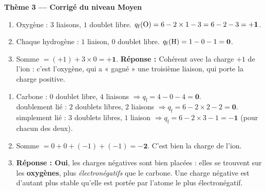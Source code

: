 \documentclass[11pt,a4paper]{article}
\newcommand{\rep}{\textbf{\textcolor{corcol}{Réponse : }}}
\begin{document}
\begin{center}
{\Large\bfseries\color{primarydark}Thème 3 — Corrigé du niveau Moyen}
\end{center}
\medskip

\begin{cor}
\begin{enumerate}[label=\alph*),leftmargin=2em,itemsep=2pt]
  \item Oxygène : $3$ liaisons, $1$ doublet libre.\;
        $q_{\mathrm{f}}(\ce{O}) = 6 - 2\times 1 - 3 = 6 - 2 - 3 = \mathbf{+1}$.
  \item Chaque hydrogène : $1$ liaison, $0$ doublet libre.\;
        $q_{\mathrm{f}}(\ce{H}) = 1 - 0 - 1 = \mathbf{0}$.
  \item Somme $= (+1) + 3\times 0 = \mathbf{+1}$. \checkmark\;
        \rep Cohérent avec la charge $+1$ de l'ion  : c'est l'oxygène, qui a « gagné »
        une troisième liaison, qui porte la charge positive.
\end{enumerate}
\end{cor}

\begin{cor}
\begin{enumerate}[label=\alph*),leftmargin=2em,itemsep=2pt]
  \item Carbone : $0$ doublet libre, $4$ liaisons $\Rightarrow q_{\mathrm{f}} = 4 - 0 - 4 = \mathbf{0}$.\\
         doublement lié : $2$ doublets libres, $2$ liaisons $\Rightarrow
        q_{\mathrm{f}} = 6 - 2\times 2 - 2 = \mathbf{0}$.\\
         simplement lié : $3$ doublets libres, $1$ liaison $\Rightarrow
        q_{\mathrm{f}} = 6 - 2\times 3 - 1 = \mathbf{-1}$ (pour chacun des deux).
  \item Somme $= 0 + 0 + (-1) + (-1) = \mathbf{-2}$. \checkmark\; C'est bien la charge de l'ion.
  \item \rep \textbf{Oui}, les charges négatives sont bien placées : elles se trouvent sur les
        \textbf{oxygènes}, plus \emph{électronégatifs} que le carbone. Une charge négative est
        d'autant plus stable qu'elle est portée par l'atome le plus électronégatif.
\end{enumerate}
\end{cor}
\end{document}
